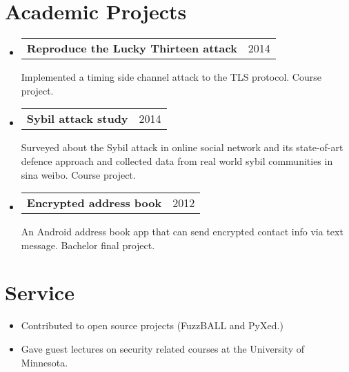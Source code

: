 \documentclass[letterpaper,11pt]{article}
\makeatletter
\newcommand{\normalItem}[1]{
  \item[-]\small{
    { #1 \vspace{-2pt}}
  }
}
\newcommand{\projectSubheading}[3]{
  \vspace{-1pt}\item[]
  \begin{tabular*}{0.97\textwidth}{l@{\extracolsep{\fill}}r}
  \textbf{\small#1} & {\small#2}\\
  \end{tabular*}
      {\small#3}\vspace{-5pt}
}
\newcommand{\resumeSubHeadingListStart}{\begin{itemize}[leftmargin=*]}
\newcommand{\resumeSubHeadingListEnd}{\end{itemize}}
\newcommand{\resumeItemListStart}{\begin{itemize}}
\newcommand{\resumeItemListEnd}{\end{itemize}\vspace{-5pt}}
\makeatother
\begin{document}
\section{Academic Projects}
\resumeSubHeadingListStart  	
\projectSubheading{Reproduce the Lucky Thirteen attack}{2014}
{Implemented a timing side channel attack to the TLS protocol. 
Course project.}
\projectSubheading{Sybil attack study}{2014}
{Surveyed about the Sybil attack in online social network and its state-of-art defence approach
and collected data from real world sybil communities in sina weibo. 
Course project.}
\projectSubheading{Encrypted address book}{2012}
{An Android address book app that can send encrypted contact info via text message. 
Bachelor final project.}
\resumeSubHeadingListEnd

\section{Service}
\resumeItemListStart
\normalItem{Contributed to open source projects (FuzzBALL and PyXed.)}
\normalItem{Gave guest lectures on security related courses at the University of Minnesota.}
\resumeItemListEnd
\end{document}
